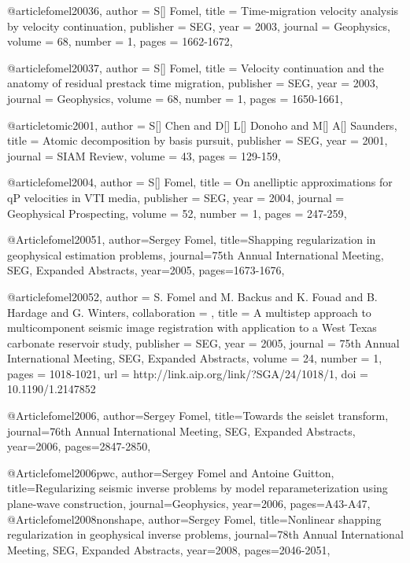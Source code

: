 @article{fomel20036,
  author =	 {S[] Fomel},
  title =	 {Time-migration velocity analysis by velocity continuation},
  publisher =	 {SEG},
  year =	 2003,
  journal =	 {Geophysics},
  volume =	 68,
  number =	 1,
  pages =	 {1662-1672},
}

@article{fomel20037,
  author =	 {S[] Fomel},
  title =	 {Velocity continuation and the anatomy of residual prestack time migration},
  publisher =	 {SEG},
  year =	 2003,
  journal =	 {Geophysics},
  volume =	 68,
  number =	 1,
  pages =	 {1650-1661},
}

@article{tomic2001,
  author =	 {S[] Chen and D[] L[] Donoho and M[] A[] Saunders},
  title =	 {Atomic decomposition by basis pursuit},
  publisher =	 {SEG},
  year =	 2001,
  journal =	 {SIAM Review},
  volume =	 43,
  pages =	 {129-159},
}

@article{fomel2004,
  author =	 {S[] Fomel},
  title =	 {On anelliptic approximations for qP velocities in VTI media},
  publisher =	 {SEG},
  year =	 2004,
  journal =	 {Geophysical Prospecting},
  volume =	 52,
  number =	 1,
  pages =	 {247-259},
}

@Article{fomel20051,
  author={Sergey Fomel},
  title={Shapping regularization in geophysical estimation problems},
  journal={75th Annual International Meeting, SEG, Expanded Abstracts},
  year=2005,
  pages={1673-1676},
}

@article{fomel20052,
author = {S. Fomel and M. Backus and K. Fouad and B. Hardage and G. Winters},
collaboration = {},
title = {A multistep approach to multicomponent seismic image
                  registration with application to a {W}est {T}exas
                  carbonate reservoir study},
publisher = {SEG},
year = {2005},
journal = {75th Annual International Meeting, SEG, Expanded Abstracts},
volume = {24},
number = {1},
pages = {1018-1021},
url = {http://link.aip.org/link/?SGA/24/1018/1},
doi = {10.1190/1.2147852}
}

@Article{fomel2006,
  author={Sergey Fomel},
  title={Towards the seislet transform},
  journal={76th Annual International Meeting, SEG, Expanded Abstracts},
  year=2006,
  pages={2847-2850},
}

@Article{fomel2006pwc,
  author={Sergey Fomel and Antoine Guitton},
  title={Regularizing seismic inverse problems by model reparameterization using plane-wave construction},
  journal={Geophysics},
  year=2006,
  pages={A43-A47},
}
@Article{fomel2008nonshape,
  author={Sergey Fomel},
  title={Nonlinear shapping regularization in geophysical inverse problems},
  journal={78th Annual International Meeting, SEG, Expanded Abstracts},
  year=2008,
  pages={2046-2051},
}

